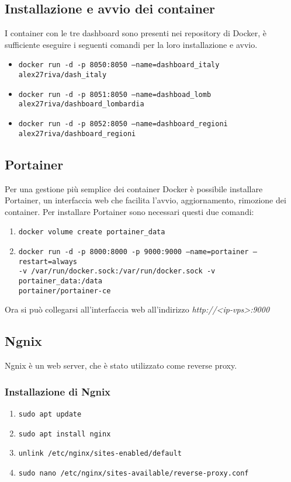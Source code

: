 \subsection{Installazione e avvio dei container}
I container con le tre dashboard sono presenti nei repository di Docker, è sufficiente eseguire i seguenti comandi per la loro installazione e avvio.
\begin{itemize}
\item \texttt{docker run -d -p 8050:8050 --name=dashboard\_italy alex27riva/dash\_italy}
\item \texttt{docker run -d -p 8051:8050 --name=dashboad\_lomb alex27riva/dashboard\_lombardia}
\item \texttt{docker run -d -p 8052:8050 --name=dashboard\_regioni alex27riva/dashboard\_regioni}
\end{itemize}

\subsection{Portainer}
Per una gestione più semplice dei container Docker è possibile installare Portainer, un interfaccia web che facilita l'avvio, aggiornamento, rimozione dei container.
Per installare Portainer sono necessari questi due comandi:
\begin{enumerate}
    \item \texttt{docker volume create portainer\_data}
    \item \texttt{docker run -d -p 8000:8000 -p 9000:9000 --name=portainer --restart=always\\ -v /var/run/docker.sock:/var/run/docker.sock -v portainer\_data:/data\\ portainer/portainer-ce}
\end{enumerate}

Ora si può collegarsi all'interfaccia web all'indirizzo \emph{http://\textless ip-vps\textgreater:9000}

\subsection{Ngnix}
Ngnix è un web server, che è stato utilizzato come reverse proxy.

\subsubsection*{Installazione di Ngnix}

\begin{enumerate}
    \item \texttt{sudo apt update}
    \item \texttt{sudo apt install nginx}
    \item \texttt{unlink /etc/nginx/sites-enabled/default}
    \item \texttt{sudo nano /etc/nginx/sites-available/reverse-proxy.conf}
\end{enumerate}

